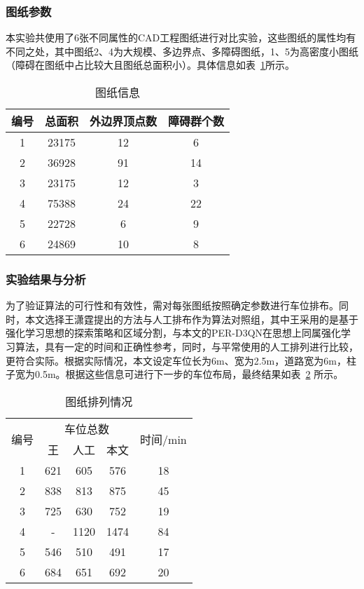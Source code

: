 \subsubsection{图纸参数}
本实验共使用了6张不同属性的CAD工程图纸进行对比实验，这些图纸的属性均有不同之处，其中图纸2、4为大规模、多边界点、多障碍图纸，1、5为高密度小图纸（障碍在图纸中占比较大且图纸总面积小）。具体信息如表~\ref{tab:drawing_info}所示。
\begin{table}[!htb]
    \caption{\label{tab:drawing_info}图纸信息}
    \centering
    \linespread{1.5}\selectfont
    \begin{tabular}{cccc}
        \hline
        编号 & 总面积 & 外边界顶点数 & 障碍群个数\\ 
        \hline
        1  & 23175  & 12 & 6   \\
        2  & 36928  & 91 & 14  \\
        3  & 23175  & 12 & 3   \\
        4  & 75388  & 24 & 22  \\
        5  & 22728  & 6  & 9   \\
        6  & 24869  & 10 & 8   \\
        \hline
    \end{tabular}
\end{table}
\subsubsection{实验结果与分析}
为了验证算法的可行性和有效性，需对每张图纸按照确定参数进行车位排布。同时，本文选择王潇霆\cite{1022674189.nh}提出的方法与人工排布作为算法对照组，其中王采用的是基于强化学习思想的探索策略和区域分割，与本文的PER-D3QN在思想上同属强化学习算法，具有一定的时间和正确性参考，同时，与平常使用的人工排列进行比较，更符合实际。根据实际情况，本文设定车位长为6m、宽为2.5m，道路宽为6m，柱子宽为0.5m。根据这些信息可进行下一步的车位布局，最终结果如表~\ref{tab:paving_situation} 所示。
\begin{table}[!htb]
    \caption{\label{tab:paving_situation}图纸排列情况}
    \centering
    \linespread{1.5}\selectfont
    \begin{tabular}{ccccc}
        \hline
        \multirow{2}{*}{编号} & \multicolumn{3}{c}{车位总数} & \multirow{2}{*}{时间/min} \\ 
        \cline{2-4}
         & 王 & 人工 & 本文 & \\ 
        \hline
        1  & 621  & 605  & 576  & 18  \\
        2  & 838  & 813  & 875  & 45  \\
        3  & 725  & 630  & 752  & 19  \\
        4  & -    & 1120 & 1474 & 84 \\
        5  & 546  & 510  & 491  & 17  \\
        6  & 684  & 651  & 692  & 20  \\
        \hline
    \end{tabular}
\end{table}

